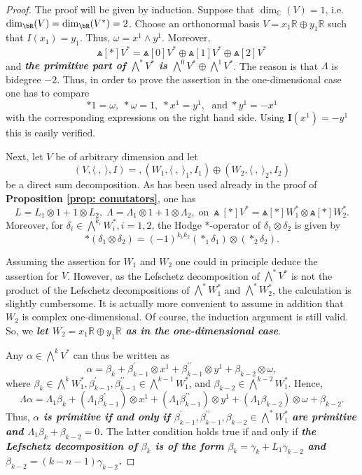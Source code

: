 \begin{proof}
The proof will be given by induction. Suppose that $\operatorname{dim}_{\mathbb{C}}(V)=1$, i.e. $\dim_{\bR}(V)=\dim_{\bR}(V^*)=2$. Choose an orthonormal basis $V=x_1 \mathbb{R} \oplus y_1 \mathbb{R}$ such that $I\left(x_1\right)=y_1$. Thus, $\omega=x^1 \wedge y^1$. Moreover, 
$$\Wedge[*] V^*=\Wedge[0] V^* \oplus \Wedge[1] V^* \oplus \Wedge[2] V^*$$ 
and \textit{\textbf{the primitive part of $\bigwedge^* V^*$ is $\bigwedge^0 V^* \oplus \bigwedge^1 V^*$}}. The reason is that $\Lambda$ is bidegree $-2$. Thus, in order to prove the assertion in the one-dimensional case one has to compare 
\[
 *1=\omega,\; * \omega=1,\; * x^1=y^1,\;\text{ and}\;  * y^1=-x^1
\] 
with the corresponding expressions on the right hand side. Using $\mathbf{I}\left(x^1\right)=-y^1$ this is easily verified.

Next, let $V$ be of arbitrary dimension and let 
\[(V,\langle~,~\rangle, I)=,\left(W_1,\langle~,~\rangle_1, I_1\right) \oplus \left(W_2,\langle~,~\rangle_2, I_2\right)\]
be a direct sum decomposition. As has been used already in the proof of \textbf{Proposition \ref{prop: comutators}}, one has 
\[
 L=L_1 \otimes 1+1 \otimes L_2 ,\;  \Lambda=\Lambda_1 \otimes 1+1 \otimes \Lambda_2 , \;\text{on}\;  \Wedge[*] V^*=\Wedge[*] W_1^* \otimes \Wedge[*] W_2^*.
\] 
Moreover, for $\delta_i \in \bigwedge^{k_i} W_i^*, i=1,2$, the Hodge *-operator of $\delta_1 \otimes \delta_2$ is given by 
\[
 *\left(\delta_1 \otimes \delta_2\right)=(-1)^{k_1 k_2}\left(*_1 \delta_1\right) \otimes\left(*_2 \delta_2\right).
\]

Assuming the assertion for $W_1$ and $W_2$ one could in principle deduce the assertion for $V$. However, as the Lefschetz decomposition of $\bigwedge^* V^*$ is not the product of the Lefschetz decompositions of $\bigwedge^* W_1^*$ and $\bigwedge^* W_2^*$, the calculation is slightly cumbersome. It is actually more convenient to assume in addition that $W_2$ is complex one-dimensional. Of course, the induction argument is still valid. So, we \textit{\textbf{let $W_2=x_1 \mathbb{R} \oplus y_1 \mathbb{R}$ as in the one-dimensional case}}.

Any $\alpha \in \bigwedge^k V^*$ can thus be written as
$$
\alpha=\beta_k+\beta_{k-1}^{\prime} \otimes x^1+\beta_{k-1}^{\prime \prime} \otimes y^1+\beta_{k-2} \otimes \omega,
$$
where $\beta_k \in \bigwedge^k W_1^*, \beta_{k-1}^{\prime}, \beta_{k-1}^{\prime \prime} \in \bigwedge^{k-1} W_1^*$, and $\beta_{k-2} \in \bigwedge^{k-2} W_1^*$. Hence, 
\[\Lambda \alpha=\Lambda_1 \beta_k+\left(\Lambda_1 \beta_{k-1}^{\prime}\right) \otimes x^1+\left(\Lambda_1 \beta_{k-1}^{\prime \prime}\right) \otimes y^1+\left(\Lambda_1 \beta_{k-2}\right) \otimes \omega+\beta_{k-2}.\]
 Thus, \textit{\textbf{$\alpha$ is primitive if and only if \textcolor[rgb]{0.41,0.20,0.60}{$\beta_{k-1}^{\prime}, \beta_{k-1}^{\prime \prime}, \beta_{k-2} \in \bigwedge^* W_1^*$ 
 are primitive} and \textcolor[rgb]{0.65,0.14,0.38}{$\Lambda_1 \beta_k+\beta_{k-2}=0$}.}} \textcolor[rgb]{0.65,0.14,0.38}{The latter condition} holds true if and only if \textit{\textbf{the Lefschetz decomposition of $\beta_k$ is of the form $\beta_k=\gamma_k+L_1 \gamma_{k-2}$ and $\beta_{k-2}=(k-n- 1) \gamma_{k-2}$.}}


\end{proof}
